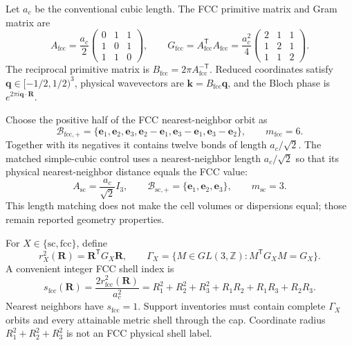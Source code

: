 \documentclass[11pt]{article}
\newcommand{\Z}{\mathbb Z}
\begin{document}
Let $a_c$ be the conventional cubic length.  The FCC primitive matrix and Gram matrix
are
\begin{equation}
 A_{\mathrm{fcc}}=\frac{a_c}{2}
 \begin{pmatrix}
 0&1&1\\
 1&0&1\\
 1&1&0
 \end{pmatrix},
 \qquad
 G_{\mathrm{fcc}}=A_{\mathrm{fcc}}^{\mathsf T}A_{\mathrm{fcc}}
 =\frac{a_c^2}{4}
 \begin{pmatrix}
 2&1&1\\
 1&2&1\\
 1&1&2
 \end{pmatrix}.
 \label{eq:fcc-metric}
\end{equation}
The reciprocal primitive matrix is
$B_{\mathrm{fcc}}=2\pi A_{\mathrm{fcc}}^{-\mathsf T}$.  Reduced coordinates satisfy
$\mathbf q\in[-1/2,1/2)^3$, physical wavevectors are
$\mathbf k=B_{\mathrm{fcc}}\mathbf q$, and the Bloch phase is
$e^{2\pi i\mathbf q\cdot\mathbf R}$.

Choose the positive half of the FCC nearest-neighbor orbit as
\begin{equation}
 \mathcal B_{\mathrm{fcc},+}
 =\{\mathbf e_1,\mathbf e_2,\mathbf e_3,
     \mathbf e_2-\mathbf e_1,
     \mathbf e_3-\mathbf e_1,
     \mathbf e_3-\mathbf e_2\},
 \qquad m_{\mathrm{fcc}}=6.
 \label{eq:fcc-bonds}
\end{equation}
Together with its negatives it contains twelve bonds of length $a_c/\sqrt2$.  The
matched simple-cubic control uses a nearest-neighbor length $a_c/\sqrt2$ so that its
physical nearest-neighbor distance equals the FCC value:
\begin{equation}
 A_{\mathrm{sc}}=\frac{a_c}{\sqrt2}I_3,
 \qquad
 \mathcal B_{\mathrm{sc},+}=\{\mathbf e_1,\mathbf e_2,\mathbf e_3\},
 \qquad m_{\mathrm{sc}}=3.
\end{equation}
This length matching does not make the cell volumes or dispersions equal; those remain
reported geometry properties.

For $X\in\{\mathrm{sc},\mathrm{fcc}\}$, define
\begin{equation}
 r_X^2(\mathbf R)=\mathbf R^{\mathsf T}G_X\mathbf R,
 \qquad
 \Gamma_X=\{M\in GL(3,\Z):M^{\mathsf T}G_XM=G_X\}.
 \label{eq:metric-and-group}
\end{equation}
A convenient integer FCC shell index is
\begin{equation}
 s_{\mathrm{fcc}}(\mathbf R)
 =\frac{2r_{\mathrm{fcc}}^2(\mathbf R)}{a_c^2}
 =R_1^2+R_2^2+R_3^2+R_1R_2+R_1R_3+R_2R_3.
 \label{eq:fcc-shell-index}
\end{equation}
Nearest neighbors have $s_{\mathrm{fcc}}=1$.  Support inventories must contain complete
$\Gamma_X$ orbits and every attainable metric shell through the cap.  Coordinate radius
$R_1^2+R_2^2+R_3^2$ is not an FCC physical shell label.
\end{document}

